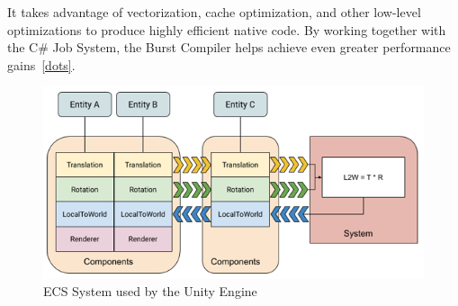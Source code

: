 It takes advantage of vectorization, cache optimization, and other low-level optimizations to produce highly efficient native code.
By working together with the C\# Job System, the Burst Compiler helps achieve even greater performance gains~\ref{dots}.
\begin{figure}
    \centering
    \includegraphics[width=\textwidth]{Pictures/res/fundamentals/ECSBlockDiagram-unity}
    \caption{ECS System used by the Unity Engine~\cite{unity-ecs}}
    \label{fig:ecs-unity}
\end{figure}
